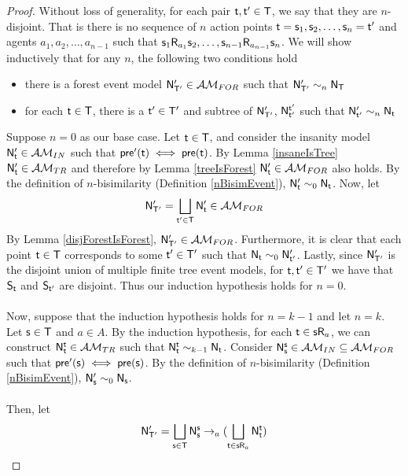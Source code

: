 \begin{proof}
Without loss of generality, for each pair $\evt, \evt' \in \evT$, we say that they are
$n$-disjoint.
That is there is no sequence of $n$ action points $\evt = \evs_1, \evs_2, \ldots,
\evs_n = \evt'$ and agents $a_1, a_2, \ldots, a_{n-1}$ such that $\evs_1 \evR_{a_1} \evs_2,
    \ldots, \evs_{n-1} \evR_{a_{n-1}} \evs_n$.
We will show inductively that for any $n$, the following two conditions hold
\begin{itemize}
\item there is a forest event model $\evM'_{\evT'} \in \forestClass$ such that $\evM'_{\evT'} \sim_n \evM_\evT$
\item for each $\evt \in \evT$, there is a $\evt' \in \evT'$ and subtree of $\evM'_{\evT'}$, $\evM^{\evt'}_{\evt'}$ such that
$\evM'_{\evt'} \sim_n \evM_\evt$
\end{itemize}
Suppose $n = 0$ as our base case.
Let $\evt \in \evT$, and consider the insanity model $\evM'_{\evt} \in \insaneClass$ such that $\evpr'(\evt) \iff
\evpr(\evt)$.
By Lemma \ref{insaneIsTree} $\evM'_{\evt} \in \treeClass$ and therefore by Lemma \ref{treeIsForest}
$\evM'_{\evt} \in \forestClass$ also holds.
By the definition of $n$-bisimilarity (Definition \ref{nBisimEvent}), $\evM'_{\evt}
\sim_0 \evM_\evt$.
Now, let
\[
  \evM'_{\evT'} = \bigsqcup_{\evt' \in \evT} \evM'_{\evt} \in \forestClass
\]
By Lemma \ref{disjForestIsForest}, $\evM'_{\evT'} \in \forestClass$.
Furthermore, it is clear that each point $\evt \in \evT$ corresponds to some $\evt' \in \evT'$ such that $\evM_\evt
\sim_0 \evM'_{\evt'}$.
Lastly, since $\evM'_{\evT'}$ is the disjoint union of multiple finite tree event models, for $\evt, \evt' \in
\evT'$ we have that $\evS_\evt$ and $\evS_{\evt'}$ are disjoint.
Thus our induction hypothesis holds for $n = 0$.\\
\\
Now, suppose that the induction hypothesis holds for $n = k-1$ and let $n = k$.
Let $\evs \in \evT$ and $a \in A$.
By the induction hypothesis, for each $\evt \in \evs \evR_a$, we can construct $\evM^\evt_\evt \in \treeClass$ such that
$\evM^\evt_\evt \sim_{k-1} \evM_\evt$.
Consider $\evM^\evs_\evs \in \insaneClass \subseteq \forestClass$ such that $\evpr'(\evs) \iff
\evpr(\evs)$.
By the definition of $n$-bisimilarity (Definition \ref{nBisimEvent}), $\evM'_{\evs}
\sim_0 \evM_\evs$.\\
\\
Then, let
\[
  \evM'_{\evT'} = \bigsqcup_{\evs \in \evT} \evM^\evs_\evs \to_a (\bigsqcup_{\evt \in \evs \evR_a} \evM^\evt_{\evt})
\]
\end{proof}
